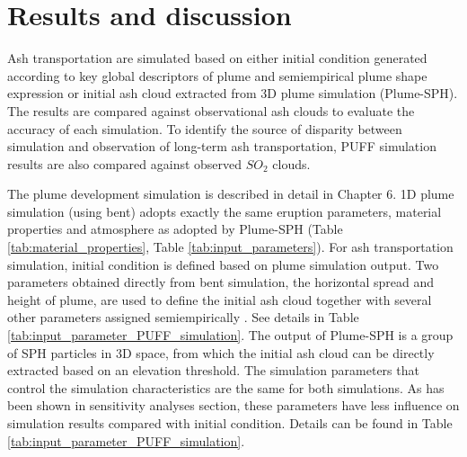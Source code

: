 \section{Results and discussion}

Ash transportation are simulated based on either initial condition generated according to key global descriptors of plume and semiempirical plume shape expression or initial ash cloud extracted from 3D plume simulation (Plume-SPH). The results are compared against observational ash clouds to evaluate the accuracy of each simulation. To identify the source of disparity between simulation and observation of long-term ash transportation, PUFF simulation results are also compared against observed $SO_2$ clouds.

The plume development simulation is described in detail in Chapter 6. 1D plume simulation (using bent) adopts exactly the same eruption parameters, material properties and atmosphere as adopted by Plume-SPH (Table \ref{tab:material_properties}, Table \ref{tab:input_parameters}).
For ash transportation simulation, initial condition is defined based on plume simulation output. Two parameters obtained directly from bent simulation, the horizontal spread and height of plume, are used to define the initial ash cloud together with several other parameters assigned semiempirically \citep{bursik2012estimation}. See details in Table \ref{tab:input_parameter_PUFF_simulation}. The output of Plume-SPH is a group of SPH particles in 3D space, from which the initial ash cloud can be directly extracted based on an elevation threshold. The simulation parameters that control the simulation characteristics are the same for both simulations. As has been shown in sensitivity analyses section, these parameters have less influence on simulation results compared with initial condition. Details can be found in Table \ref{tab:input_parameter_PUFF_simulation}.

